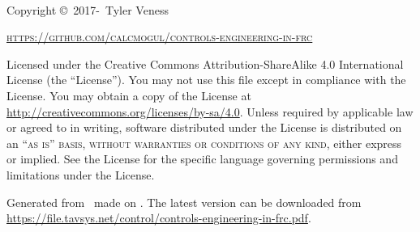 ~\vfill
\thispagestyle{empty}

Copyright \copyright\ 2017-\unskip~Tyler Veness

\textsc{\url{https://github.com/calcmogul/controls-engineering-in-frc}}

Licensed under the Creative Commons Attribution-ShareAlike 4.0 International
License (the ``License''). You may not use this file except in compliance with
the License. You may obtain a copy of the License at
\url{http://creativecommons.org/licenses/by-sa/4.0}. Unless required by
applicable law or agreed to in writing, software distributed under the License
is distributed on an \textsc{``as is'' basis, without warranties or conditions
of any kind}, either express or implied. See the License for the specific
language governing permissions and limitations under the License.

Generated from \unskip~made on
\unskip. The latest version can be downloaded from
\url{https://file.tavsys.net/control/controls-engineering-in-frc.pdf}.
